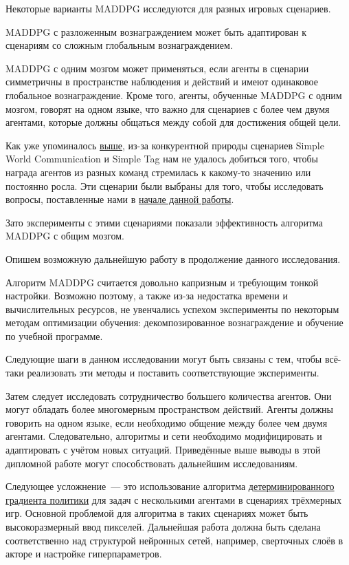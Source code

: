 Некоторые варианты MADDPG исследуются для разных игровых сценариев.

MADDPG с разложенным вознаграждением может быть адаптирован к сценариям со сложным глобальным вознаграждением.

MADDPG с одним мозгом может применяться, если агенты в сценарии симметричны в пространстве наблюдения и действий и имеют одинаковое глобальное вознаграждение. Кроме того, агенты, обученные MADDPG с одним мозгом, говорят на одном языке, что важно для сценариев с более чем двумя агентами, которые должны общаться между собой для достижения общей цели.

Как уже упоминалось \hyperref[exp-results-svc]{выше}, из-за конкурентной природы сценариев Simple World Communication и Simple Tag нам не удалось добиться того, чтобы награда агентов из разных команд стремилась к какому-то значению или постоянно росла. Эти сценарии были выбраны для того, чтобы исследовать вопросы, поставленные нами в \hyperref[intro-questions]{начале данной работы}.

Зато эксперименты с этими сценариями показали эффективность алгоритма MADDPG с общим мозгом.

Опишем возможную дальнейшую работу в продолжение данного исследования.

Алгоритм MADDPG считается довольно капризным и требующим тонкой настройки. Возможно поэтому, а также из-за недостатка времени и вычислительных ресурсов, не увенчались успехом эксперименты по некоторым методам оптимизации обучения: декомпозированное вознаграждение и обучение по учебной программе.

Следующие шаги в данном исследовании могут быть связаны с тем, чтобы всё-таки реализовать эти методы и поставить соответствующие эксперименты.

Затем следует исследовать сотрудничество большего количества агентов. Они могут обладать более многомерным пространством действий. Агенты должны говорить на одном языке, если необходимо общение между более чем двумя агентами. Следовательно, алгоритмы и сети необходимо модифицировать и адаптировать с учётом новых ситуаций. Приведённые выше выводы в этой дипломной работе могут способствовать дальнейшим исследованиям.

Следующее усложнение~--- это использование алгоритма \hyperref[acr:dpg]{детерминированного градиента политики} для задач с несколькими агентами в сценариях трёхмерных игр. Основной проблемой для алгоритма в таких сценариях может быть высокоразмерный ввод пикселей. Дальнейшая работа должна быть сделана соответственно над структурой нейронных сетей, например, сверточных слоёв в акторе и настройке гиперпараметров.

